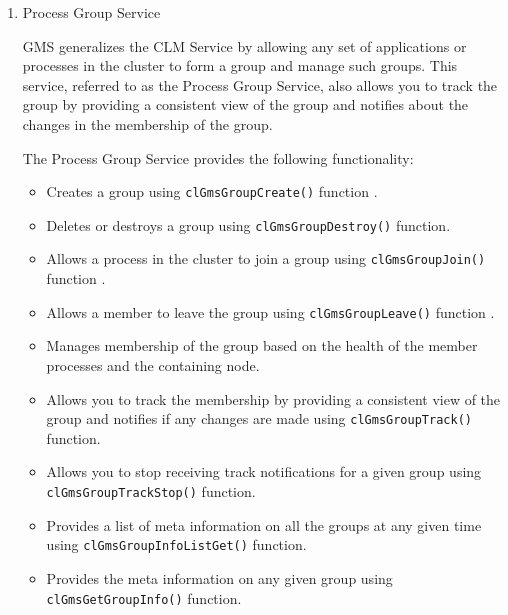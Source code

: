 \begin{flushleft}
\begin{enumerate}
\item \begin{bf}Process Group Service \end{bf}
\newline
GMS generalizes the CLM Service by allowing any set of applications
or processes in the cluster to form a group and manage such groups.
This service, referred to as the Process Group Service, also allows
you to track the group by providing a consistent view of the group
and notifies about the changes in the membership of the group.
\newline
\par
The Process Group Service provides the following functionality:
\begin{itemize}
\item Creates a group using {\tt{clGmsGroupCreate()}} function .
\item Deletes or destroys a group using {\tt{clGmsGroupDestroy()}} function.
\item Allows a process in the cluster to join a group using {\tt{clGmsGroupJoin()}} function .
\item Allows a member to leave the group using {\tt{clGmsGroupLeave()}} function .
\item Manages membership of the group based on the health of the member processes and the containing node.
\item Allows you to track the membership by providing a consistent view of the group and notifies if any changes are made using {\tt{clGmsGroupTrack()}} function.
\item Allows you to stop receiving track notifications for a given group using {\tt{clGmsGroupTrackStop()}} function.
\item Provides a list of meta information on all the groups at any given time using {\tt{clGmsGroupInfoListGet()}} function.
\item Provides the meta information on any given group using {\tt{clGmsGetGroupInfo()}} function.
\end{itemize}
\end{enumerate}



\end{flushleft}
